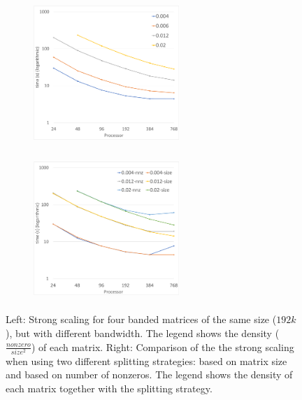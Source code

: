 \begin{figure}[tbh]
    \centering
    \begin{subfigure}{.45\textwidth}
        \centering
        \includegraphics[width=5.5cm,height=5.4cm]{./figures/strong_size.pdf}
    \end{subfigure}
    \begin{subfigure}{.45\textwidth}
        \includegraphics[width=5.5cm,height=5.4cm]{./figures/strong_size_vs_nnz.pdf}
    \end{subfigure}
    \caption{Left: Strong scaling for four banded matrices of the same size ($192k$), but with different bandwidth. The legend shows the density ($\frac{nonzero}{size^2}$) of each matrix. Right: Comparison of the the strong scaling when using two different splitting strategies: based on matrix size and based on number of nonzeros. The legend shows the density of each matrix together with the splitting strategy.}
    \label{fig:strong1}
\end{figure}

